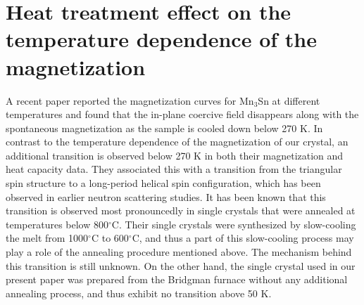 \documentclass[amsmath,amssymb]{nature}
\begin{document}
	
	
	
	
	
	
	
	
	
	
\section{Heat treatment effect on the temperature dependence of the magnetization}
	A recent paper reported the magnetization curves for Mn$_3$Sn at different temperatures and found that the in-plane coercive field disappears along with the spontaneous magnetization as the sample is cooled down below 270 K\cite{Duan2015}. In contrast to the temperature dependence of the magnetization of our crystal, an additional transition is observed below 270 K in both their magnetization and heat capacity data. They associated this with a transition from the triangular spin structure to a long-period helical spin configuration, which has been observed in earlier neutron scattering studies\cite{cable1993}. It has been known that this transition is observed most pronouncedly in single crystals that were annealed at temperatures below 800$^{\circ}$C\cite{ohmori1987}. Their single crystals were synthesized by slow-cooling the melt from 1000$^{\circ}$C to 600$^{\circ}$C, and thus a part of this slow-cooling process may play a role of the annealing procedure mentioned above. The mechanism behind this transition is still unknown. On the other hand, the single crystal used in our present paper was prepared from the Bridgman furnace without any additional annealing process, and thus exhibit no transition above 50 K\cite{tomiyoshi1986triangular}.
	
\end{document}

